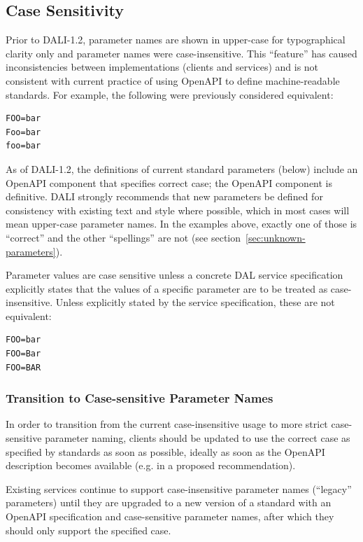 \documentclass[11pt,letter]{ivoa}
\begin{document}
\subsection{Case Sensitivity}
Prior to DALI-1.2, parameter names are shown in upper-case for typographical clarity
only and parameter names were case-insensitive. This ``feature'' has caused
inconsistencies between implementations (clients and services) and is not consistent
with current practice of using OpenAPI to define machine-readable standards. For example,
the following were previously considered equivalent:

\begin{verbatim}
FOO=bar
Foo=bar
foo=bar
\end{verbatim}

As of DALI-1.2, the definitions of current standard parameters (below) include an
OpenAPI component that specifies correct case; the OpenAPI component is definitive.
DALI strongly recommends that new parameters be defined for consistency with existing 
text and style where possible, which in most cases will mean upper-case parameter
names. In the examples above, exactly one of those is ``correct'' and the other 
``spellings'' are not (see section~\ref{sec:unknown-parameters}).

Parameter values are case sensitive unless a concrete DAL service specification
explicitly states that the values of a specific parameter are to be treated as
case-insensitive. Unless explicitly stated by the service specification, these are
not equivalent:

\begin{verbatim}
FOO=bar
FOO=Bar
FOO=BAR
\end{verbatim}

\subsubsection{Transition to Case-sensitive Parameter Names}
In order to transition from the current case-insensitive usage to more strict
case-sensitive parameter naming, clients should be updated to use the correct
case as specified by standards as soon as possible, ideally as soon as the OpenAPI
description becomes available (e.g. in a proposed recommendation).

Existing services continue to support case-insensitive parameter names
(``legacy'' parameters) until they are upgraded to a new version of a
standard with an OpenAPI specification and case-sensitive parameter names, after
which they should only support the specified case.
\end{document}

